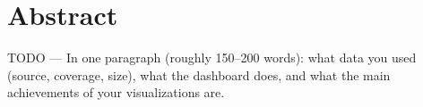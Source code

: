 \section*{Abstract}

TODO --- In one paragraph (roughly 150--200 words): what data you used
(source, coverage, size), what the dashboard does, and what the main
achievements of your visualizations are.

\vspace{1em}

